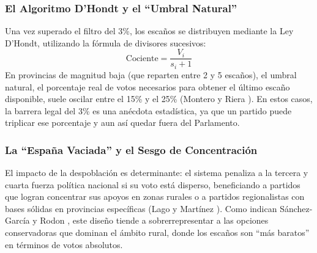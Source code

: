 \subsubsection{El Algoritmo D'Hondt y el ``Umbral Natural''}
Una vez superado el filtro del 3\%, los escaños se distribuyen mediante la Ley D'Hondt, utilizando la fórmula de divisores sucesivos:
\begin{equation}
\text{Cociente} = \frac{V_{i}}{s_{i} + 1}
\end{equation}
En provincias de magnitud baja (que reparten entre 2 y 5 escaños), el umbral natural, el porcentaje real de votos necesarios para obtener el último escaño disponible, suele oscilar entre el 15\% y el 25\% (Montero y Riera \cite{montero2009}). En estos casos, la barrera legal del 3\% es una anécdota estadística, ya que un partido puede triplicar ese porcentaje y aun así quedar fuera del Parlamento.

\subsubsection{La ``España Vaciada'' y el Sesgo de Concentración}
El impacto de la despoblación es determinante: el sistema penaliza a la tercera y cuarta fuerza política nacional si su voto está disperso, beneficiando a partidos que logran concentrar sus apoyos en zonas rurales o a partidos regionalistas con bases sólidas en provincias específicas (Lago y Martínez \cite{lago2013}). Como indican Sánchez-García y Rodon \cite{sanchez2023}, este diseño tiende a sobrerrepresentar a las opciones conservadoras que dominan el ámbito rural, donde los escaños son ``más baratos'' en términos de votos absolutos.
